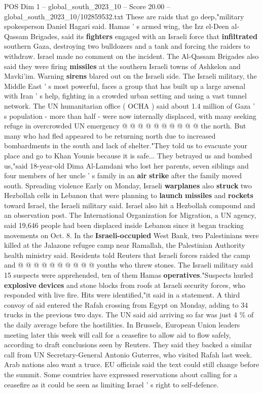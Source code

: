 \begin{textsample}{POS Dim 1 – global\_south\_2023\_10 – Score 20.00 – global\_south\_2023\_10/102859532.txt}
These are raids that go deep,"military spokesperson Daniel Hagari said.
Hamas ' s armed wing, the Izz el-Deen al-Qassam Brigades, said its \textbf{fighters} engaged with an Israeli force that \textbf{infiltrated} southern Gaza, destroying two bulldozers and a tank and forcing the raiders to withdraw.
Israel made no comment on the incident.
The Al-Qassam Brigades also said they were firing \textbf{missiles} at the southern Israeli towns of Ashkelon and Mavki'im.
Warning \textbf{sirens} blared out on the Israeli side.
The Israeli military, the Middle East ' s most powerful, faces a group that has built up a large arsenal with Iran ' s help, fighting in a crowded urban setting and using a vast tunnel network.
The UN humanitarian office ( OCHA ) said about 1.4 million of Gaza ' s population - more than half - were now internally displaced, with many seeking refuge in overcrowded UN emergency @ @ @ @ @ @ @ @ @ @ the north.
But many who had fled appeared to be returning north due to increased bombardments in the south and lack of shelter."They told us to evacuate your place and go to Khan Younis because it is safe...
They betrayed us and bombed us,"said 18-year-old Dima Al-Lamdani who lost her parents, seven siblings and four members of her uncle ' s family in an \textbf{air} \textbf{strike} after the family moved south.
Spreading violence Early on Monday, Israeli \textbf{warplanes} also \textbf{struck} two Hezbollah cells in Lebanon that were planning to \textbf{launch} \textbf{missiles} and \textbf{rockets} toward Israel, the Israeli military said.
Israel also hit a Hezbollah compound and an observation post.
The International Organization for Migration, a UN agency, said 19,646 people had been displaced inside Lebanon since it began tracking movements on Oct. 8.
In the \textbf{Israeli-occupied} West Bank, two Palestinians were killed at the Jalazone refugee camp near Ramallah, the Palestinian Authority health ministry said.
Residents told Reuters that Israeli forces raided the camp and @ @ @ @ @ @ @ @ @ @ youths who threw stones.
The Israeli military said 15 suspects were apprehended, ten of them Hamas \textbf{operatives}."Suspects hurled \textbf{explosive} \textbf{devices} and stone blocks from roofs at Israeli security forces, who responded with live fire.
Hits were identified,"it said in a statement.
A third convoy of aid entered the Rafah crossing from Egypt on Monday, adding to 34 trucks in the previous two days.
The UN said aid arriving so far was just 4 \% of the daily average before the hostilities.
In Brussels, European Union leaders meeting later this week will call for a ceasefire to allow aid to flow safely, according to draft conclusions seen by Reuters.
They said they backed a similar call from UN Secretary-General Antonio Guterres, who visited Rafah last week.
Arab nations also want a truce.
EU officials said the text could still change before the summit.
Some countries have expressed reservations about calling for a ceasefire as it could be seen as limiting Israel ' s right to self-defence.


\end{textsample}
